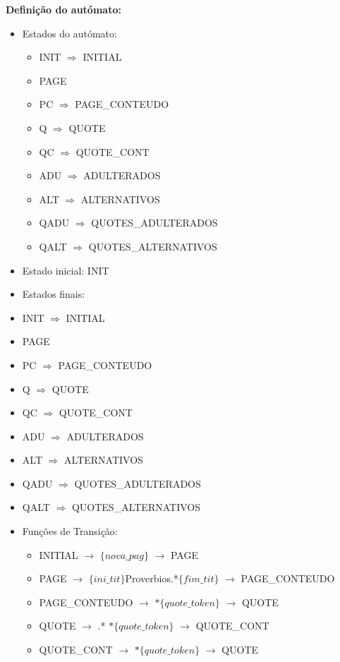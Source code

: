 \documentclass[11pt,a4paper]{report}
\begin{document}
	\vspace{1.0cm}

\textbf{Definição do autómato:}

\begin{itemize}
	\item Estados do autómato:
		\begin{itemize}
			\item INIT $\Rightarrow$ INITIAL
			\item PAGE
			\item PC $\Rightarrow$ PAGE\_CONTEUDO
			\item Q $\Rightarrow$ QUOTE
			\item QC $\Rightarrow$ QUOTE\_CONT
			\item ADU $\Rightarrow$ ADULTERADOS
			\item ALT $\Rightarrow$ ALTERNATIVOS
			\item QADU $\Rightarrow$ QUOTES\_ADULTERADOS
			\item QALT $\Rightarrow$ QUOTES\_ALTERNATIVOS
		\end{itemize}
	\item Estado inicial: INIT
	\item Estados finais:
		\item INIT $\Rightarrow$ INITIAL
			\item PAGE
			\item PC $\Rightarrow$ PAGE\_CONTEUDO
			\item Q $\Rightarrow$ QUOTE
			\item QC $\Rightarrow$ QUOTE\_CONT
			\item ADU $\Rightarrow$ ADULTERADOS
			\item ALT $\Rightarrow$ ALTERNATIVOS
			\item QADU $\Rightarrow$ QUOTES\_ADULTERADOS
			\item QALT $\Rightarrow$ QUOTES\_ALTERNATIVOS
	\item Funções de Transição:
		\begin{itemize}
			\item INITIAL $\rightarrow$ $\{nova\_pag\}$ $\rightarrow$ PAGE
			\item PAGE $\rightarrow$ $\{ini\_tit\}$Proverbios.*$\{fim\_tit\}$ $\rightarrow$ PAGE\_CONTEUDO
			\item PAGE\_CONTEUDO $\rightarrow$ $*\{quote\_token\}$ $\rightarrow$ QUOTE
			\item QUOTE $\rightarrow$ .* $*\{quote\_token\}$ $\rightarrow$	QUOTE\_CONT
			\item QUOTE\_CONT $\rightarrow$ $*\{quote\_token\}$ $\rightarrow$ QUOTE

\end{itemize}
\end{itemize}
\end{document}
